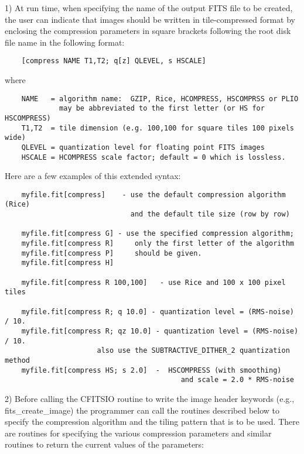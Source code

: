 \documentclass[11pt]{book}
\begin{document}
1)  At run time, when specifying the name of the output FITS file to be
created, the user can indicate that images should be
written in tile-compressed format by enclosing the compression
parameters in square brackets following the root disk file name
in the following format:

\begin{verbatim}
    [compress NAME T1,T2; q[z] QLEVEL, s HSCALE]
\end{verbatim}
where

\begin{verbatim}
    NAME   = algorithm name:  GZIP, Rice, HCOMPRESS, HSCOMPRSS or PLIO
             may be abbreviated to the first letter (or HS for HSCOMPRESS)
    T1,T2  = tile dimension (e.g. 100,100 for square tiles 100 pixels wide)
    QLEVEL = quantization level for floating point FITS images
    HSCALE = HCOMPRESS scale factor; default = 0 which is lossless.
\end{verbatim}

Here are a few examples of this extended syntax:


\begin{verbatim}
    myfile.fit[compress]    - use the default compression algorithm (Rice)
                              and the default tile size (row by row)

    myfile.fit[compress G] - use the specified compression algorithm;
    myfile.fit[compress R]     only the first letter of the algorithm
    myfile.fit[compress P]     should be given.
    myfile.fit[compress H]

    myfile.fit[compress R 100,100]   - use Rice and 100 x 100 pixel tiles

    myfile.fit[compress R; q 10.0] - quantization level = (RMS-noise) / 10.
    myfile.fit[compress R; qz 10.0] - quantization level = (RMS-noise) / 10.
                      also use the SUBTRACTIVE_DITHER_2 quantization method
    myfile.fit[compress HS; s 2.0]  -  HSCOMPRESS (with smoothing)
                                          and scale = 2.0 * RMS-noise
\end{verbatim}

2)  Before calling the CFITSIO routine to write the image header
keywords (e.g., fits\_create\_image) the programmer can call the
routines described below to specify the compression algorithm and the
tiling pattern that is to be used.  There are routines for specifying
the various compression parameters and similar routines to
return the current values of the parameters:
\label{ffsetcomp}  \label{ffgetcomp}
\end{document}
